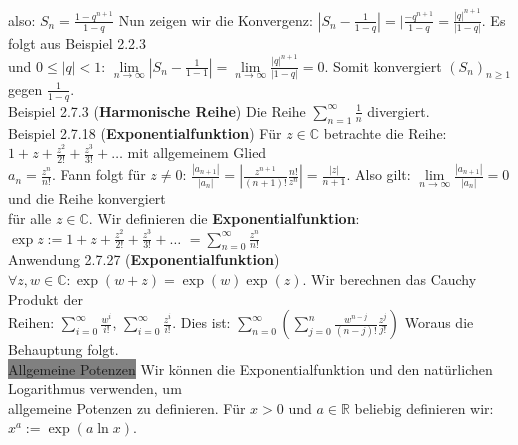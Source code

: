 \documentclass[10pt]{article}
\begin{document}
        \indent also: $S_n=\frac{1-q^{n+1}}{1-q}$
                Nun zeigen wir die Konvergenz: 
                $|S_n-\frac{1}{1-q}|=|\frac{-q^{n+1}}{1-q}
                =\frac{|q|^{n+1}}{|1-q|}$. Es folgt aus
                Beispiel 2.2.3 \\
        \indent und $0\leqslant|q|<1$:
                $\lim\limits_{n\to\infty}|S_n-\frac{1}{1-1}|
                =\lim\limits_{n\to\infty}\frac{|q|^{n+1}}{|1-q|}=0$.
                Somit konvergiert $(S_n)_{n\geqslant1}$ gegen
                $\frac{1}{1-q}$. \\
\colorbox{Dandelion}{Beispiel 2.7.3} (\textbf{Harmonische Reihe}) Die Reihe
                $\sum_{n=1}^\infty\frac{1}{n}$ divergiert.\\
\colorbox{Dandelion}{Beispiel 2.7.18} (\textbf{Exponentialfunktion})
                Für $z\in\mathbb{C}$ betrachte die Reihe:
                $1+z+\frac{z^2}{2!}+\frac{z^3}{3!}+\dots$
                mit allgemeinem Glied \\
        \indent $a_n=\frac{z^n}{n!}$.
                Fann folgt für $z\neq0$:
                $\frac{|a_{n+1}|}{|a_n|}
                =|\frac{z^{n+1}}{(n+1)!}\frac{n!}{z^n}|
                =\frac{|z|}{n+1}$. Also gilt:
                $\lim\limits_{n\to\infty}\frac{|a_{n+1}|}{|a_n|}=0$
                und die Reihe konvergiert \\
        \indent für alle $z\in\mathbb{C}$.
                Wir definieren die \textbf{Exponentialfunktion}: 
                $\exp z:=1+z+\frac{z^2}{2!}+\frac{z^3}{3!}+\dots$
                $=\sum_{n=0}^\infty\frac{z^n}{n!}$\\
\colorbox{Dandelion}{Anwendung 2.7.27 } (\textbf{Exponentialfunktion})
                $\forall z,w\in\mathbb{C}:\exp(w+z)
                =\exp(w)\exp(z)$. Wir berechnen das Cauchy Produkt der \\
        \indent Reihen: $\sum_{i=0}^\infty\frac{w^i}{i!}$,
                $\sum_{i=0}^\infty\frac{z^i}{i!}$.
                Dies ist:
                $\sum_{n=0}^\infty(\sum_{j=0}^n\frac{w^{n-j}}{(n-j)!}
                \frac{z^j}{j!})$ Woraus die Behauptung folgt.\\
\colorbox{gray}{Allgemeine Potenzen} Wir können die Exponentialfunktion
                und den natürlichen Logarithmus verwenden, um \\
        \indent allgemeine Potenzen zu definieren. Für $x>0$ und
                $a\in\mathbb{R}$ beliebig definieren wir:
                $x^a:=\exp(a\ln x)$. \\
\end{document}
